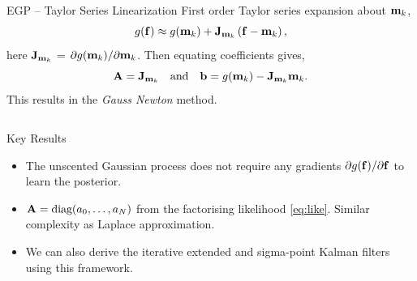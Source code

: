 \documentclass[final]{beamer}
\newlength{\onecolwid}
\newlength{\twocolwid}
\begin{document}
\begin{frame}[t]
\begin{columns}[t]
\begin{column}{\twocolwid}
\begin{columns}[t,totalwidth=\twocolwid]
\begin{column}{\onecolwid}
\begin{block}{EGP -- Taylor Series Linearization}
First order Taylor series expansion about $\mathbf{m}_k$,
\begin{equation*}
    g\!\left({{\mathbf{f}}}\right) \approx g\!\left({{\mathbf{m}_k}}\right) +
    \mathbf{J}_{\mathbf{m}_k}\left({\mathbf{f} - \mathbf{m}_k}\right),
\end{equation*}
here $\mathbf{J}_{\mathbf{m}_k}$ = $\partial g\!\left({{\mathbf{m}_k}}\right)\!/
\partial\mathbf{m}_k$. Then equating coefficients gives,
\begin{equation}
    \mathbf{A} = \mathbf{J}_{\mathbf{m}_k} \quad \text{and} \quad
    \mathbf{b} = g\!\left({{\mathbf{m}_k}}\right) - \mathbf{J}_{\mathbf{m}_k}\mathbf{m}_k.
\end{equation}
This results in the \emph{Gauss Newton} method.

\end{block}


\end{column} %

\end{columns} %


\begin{alertblock}{Key Results}

\begin{itemize}

    \item The unscented Gaussian process does not require any gradients
        $\partial g\!\left({{\mathbf{f}}}\right)\!/\partial\mathbf{f}$ to learn the posterior.

    \item $\mathbf{A} = \text{diag}\!\left({a_0, \ldots, a_N}\right)$ from the factorising
        likelihood \eqref{eq:like}. Similar complexity as Laplace
        approximation.

    \item We can also derive the iterative extended and sigma-point Kalman
        filters using this framework.
\end{itemize}

\end{alertblock} 



\end{column}
\end{columns}
\end{frame}
\end{document}
